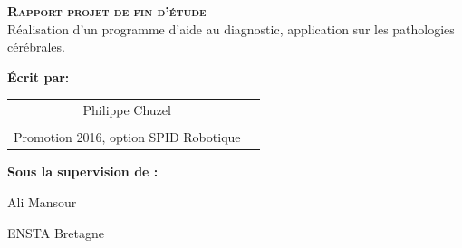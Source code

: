 
\begingroup
\thispagestyle{empty}
\begin{center}
\vspace*{2cm}
{\Huge \textsc{\textbf{Rapport projet de fin d'étude}}}\\


\vspace*{2cm}
{\huge Réalisation d'un programme d'aide au diagnostic, application sur les pathologies cérébrales.}\par %
\end{center}

\vspace*{1.5cm}
\textbf{\large Écrit par:} 
\begin{center}
{\huge 
\begin{tabular}{cc}
\\
Philippe Chuzel\\
\\
Promotion 2016, option SPID Robotique
\end{tabular}}
\end{center}


\vspace*{0.5 cm}
{\large \textbf{Sous la supervision de :}}\\
\begin{center}
{\large
Ali Mansour}
\end{center}

\vspace*{0.5 cm}
\begin{center}
{\large
ENSTA Bretagne}
\end{center}
\endgroup
